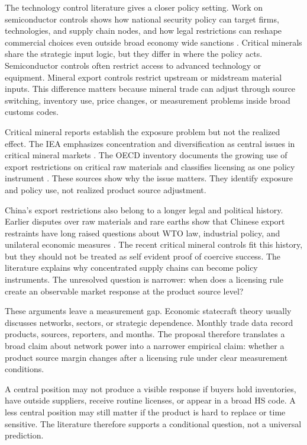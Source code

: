 \documentclass[12pt,a4paper]{article}
\numberwithin{equation}{section}
\begin{document}
The technology control literature gives a closer policy setting. Work on semiconductor controls shows how national security policy can target firms, technologies, and supply chain nodes, and how legal restrictions can reshape commercial choices even outside broad economy wide sanctions \citep{bown2020semiconductor,bown2024semiconductors}. Critical minerals share the strategic input logic, but they differ in where the policy acts. Semiconductor controls often restrict access to advanced technology or equipment. Mineral export controls restrict upstream or midstream material inputs. This difference matters because mineral trade can adjust through source switching, inventory use, price changes, or measurement problems inside broad customs codes.

Critical mineral reports establish the exposure problem but not the realized effect. The IEA emphasizes concentration and diversification as central issues in critical mineral markets \citep{iea_2025_global_critical_minerals_outlook}. The OECD inventory documents the growing use of export restrictions on critical raw materials and classifies licensing as one policy instrument \citep{oecd2026_crm_export_restrictions}. These sources show why the issue matters. They identify exposure and policy use, not realized product source adjustment.

China's export restrictions also belong to a longer legal and political history. Earlier disputes over raw materials and rare earths show that Chinese export restraints have long raised questions about WTO law, industrial policy, and unilateral economic measures \citep{bogdanova_wang2023_china_export_restrictions_wto}. The recent critical mineral controls fit this history, but they should not be treated as self evident proof of coercive success. The literature explains why concentrated supply chains can become policy instruments. The unresolved question is narrower: when does a licensing rule create an observable market response at the product source level?

These arguments leave a measurement gap. Economic statecraft theory usually discusses networks, sectors, or strategic dependence. Monthly trade data record products, sources, reporters, and months. The proposal therefore translates a broad claim about network power into a narrower empirical claim: whether a product source margin changes after a licensing rule under clear measurement conditions.

A central position may not produce a visible response if buyers hold inventories, have outside suppliers, receive routine licenses, or appear in a broad HS code. A less central position may still matter if the product is hard to replace or time sensitive. The literature therefore supports a conditional question, not a universal prediction.
\end{document}
